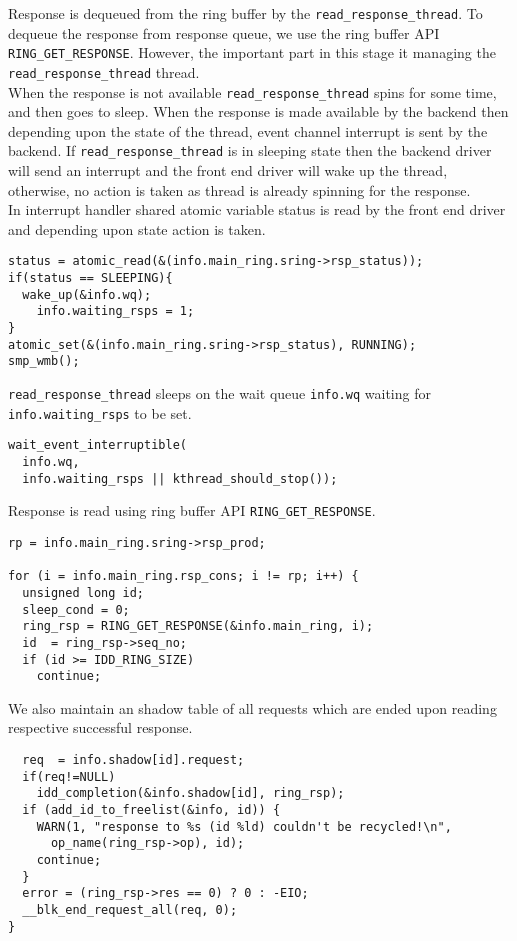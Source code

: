 Response is dequeued from the ring buffer by the \texttt{read\_response\_thread}. To dequeue the response from response queue, we use the ring buffer API \texttt{RING\_GET\_RESPONSE}. However, the important part in this stage it managing the \texttt{read\_response\_thread} thread. 
\\
When the response is not available \texttt{read\_response\_thread} spins for some time, and then goes to sleep. When the response is made available by the backend then depending upon the state of the thread, event channel interrupt is sent by the backend. If \texttt{read\_response\_thread} is in sleeping state then the backend driver will send an interrupt and the front end driver will wake up the thread, otherwise, no action is taken as thread is already spinning for the response.
\\
In interrupt handler shared atomic variable status is read by the front end driver and depending upon state action is taken.
\begin{verbatim}
status = atomic_read(&(info.main_ring.sring->rsp_status));
if(status == SLEEPING){
  wake_up(&info.wq);
	info.waiting_rsps = 1;
}
atomic_set(&(info.main_ring.sring->rsp_status), RUNNING);
smp_wmb();
\end{verbatim}
\texttt{read\_response\_thread} sleeps on the wait queue \texttt{info.wq} waiting for \texttt{info.waiting\_rsps} to be set.
\\
\begin{verbatim}
wait_event_interruptible(
  info.wq,
  info.waiting_rsps || kthread_should_stop());
\end{verbatim}
Response is read using  ring buffer API \texttt{RING\_GET\_RESPONSE}.
\begin{verbatim}
rp = info.main_ring.sring->rsp_prod;

for (i = info.main_ring.rsp_cons; i != rp; i++) {
  unsigned long id;
  sleep_cond = 0;
  ring_rsp = RING_GET_RESPONSE(&info.main_ring, i);
  id  = ring_rsp->seq_no;
  if (id >= IDD_RING_SIZE)
    continue;
\end{verbatim}
We also maintain an shadow table of all requests which are ended upon reading respective successful response. 
\begin{verbatim}
  req  = info.shadow[id].request;
  if(req!=NULL)
    idd_completion(&info.shadow[id], ring_rsp);
  if (add_id_to_freelist(&info, id)) {
    WARN(1, "response to %s (id %ld) couldn't be recycled!\n",
      op_name(ring_rsp->op), id);
    continue;
  }
  error = (ring_rsp->res == 0) ? 0 : -EIO;
  __blk_end_request_all(req, 0);
}
\end{verbatim}
